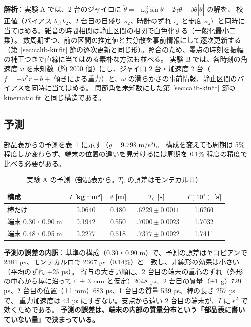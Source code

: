 \documentclass[paper=a4paper,fontsize=10pt,twocolumn,column_gap=2zw,line_length=24zw,number_of_lines=46,head_space=20mm]{jlreq}
\begin{document}
\textbf{解析}：実験 A では、2 台のジャイロに $\ddot\theta = -\omega_0^2\sin\theta - 2\gamma\dot\theta - \beta\dot\theta|\dot\theta|$ の解を、
校正値（バイアス $b_1, b_2$、2 台目の目盛り $s_2$、時計のずれ $\tau_2$ と歩度 $\kappa_2$）と同時に当てはめる。雑音の時間相関は静止区間の相関で白色化する（一般化最小二乗）。
数周期ずつ、前の区間の推定値と共分散を事前情報にして逐次更新する（第~\ref{sec:calib-kinfit} 節の逐次更新と同じ形）。照合のため、零点の時刻を振幅の補正つきで直線に当てはめる素朴な方法も並べる。
実験 B では、各時刻の角速度 $\omega$ を未知数（約 2000 個）にし、ジャイロ 2 台・加速度 2 台（$f=-\omega^2 r + b + $ 傾きによる重力）と、$\omega$ の滑らかさの事前情報、静止区間のバイアスを同時に当てはめる。
関節角を未知数にした第~\ref{sec:calib-kinfit} 節の kinematic fit と同じ構造である。

\subsection{予測}

部品表からの予測を表~\ref{tab:bgpred} に示す（$g=9.798$ m/s²）。
構成を変えても周期は 5\% 程度しか変わらず、端末の位置の違いを見分けるには周期を 0.1\% 程度の精度で比べる必要がある。

\begin{table}[t]\centering\footnotesize
\caption{実験 A の予測（部品表から。$T_0$ の誤差はモンテカルロ）}\label{tab:bgpred}
\setlength{\tabcolsep}{2.5pt}
\begin{tabular}{lcccc}\toprule
構成 & $I$ [kg·m²] & $d$ [m] & $T_0$ [s] & $T(10^\circ)$ [s] \\\midrule
棒だけ & 0.0640 & 0.480 & $1.6229\pm0.0011$ & 1.6260 \\
端末 0.30・0.90 m & 0.1942 & 0.550 & $1.7000\pm0.0023$ & 1.7032 \\
端末 0.48・0.95 m & 0.2277 & 0.618 & $1.7377\pm0.0022$ & 1.7411 \\\bottomrule
\end{tabular}
\end{table}

\textbf{予測の誤差の内訳}：基準の構成（0.30・0.90 m）で、予測の誤差はヤコビアンで 2381 µs、モンテカルロで 2367 µs（0.14\%）と一致し、非線形の効果は小さい（平均のずれ +25 µs）。
寄与の大きい順に、2 台目の端末の重心のずれ（外形の中心から棒に沿って 0 ± 3 mm と仮定）2048 µs、2 台目の質量（±1 g）729 µs、2 台目の位置（±1 mm）683 µs、1 台目の質量 539 µs、棒の長さ 257 µs で、
重力加速度は 43 µs にすぎない。支点から遠い 2 台目の端末が、$I$ に $r^2$ で効くためである。
\textbf{予測の誤差は、端末の内部の質量分布という「部品表に書いていない量」で決まっている。}
\end{document}
